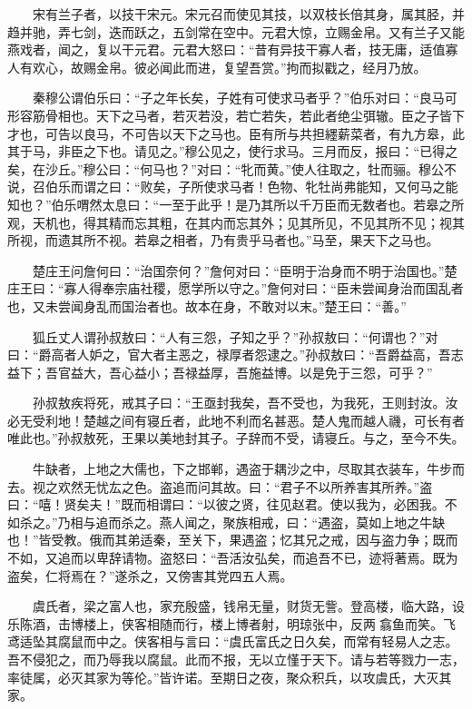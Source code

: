 　　宋有兰子者，以技干宋元。宋元召而使见其技，以双枝长倍其身，属其胫，并趋并驰，弄七剑，迭而跃之，五剑常在空中。元君大惊，立赐金帛。又有兰子又能燕戏者，闻之，复以干元君。元君大怒曰：``昔有异技干寡人者，技无庸，适值寡人有欢心，故赐金帛。彼必闻此而进，复望吾赏。''拘而拟戳之，经月乃放。

　　秦穆公谓伯乐曰：``子之年长矣，子姓有可使求马者乎？''伯乐对曰：``良马可形容筋骨相也。天下之马者，若灭若没，若亡若失，若此者绝尘弭辙。臣之子皆下才也，可告以良马，不可告以天下之马也。臣有所与共担纆薪菜者，有九方皋，此其于马，非臣之下也。请见之。''穆公见之，使行求马。三月而反，报曰：``已得之矣，在沙丘。''穆公曰：``何马也？''对曰：``牝而黄。''使人往取之，牡而骊。穆公不说，召伯乐而谓之曰：``败矣，子所使求马者！色物、牝牡尚弗能知，又何马之能知也？''伯乐喟然太息曰：``一至于此乎！是乃其所以千万臣而无数者也。若皋之所观，天机也，得其精而忘其粗，在其内而忘其外；见其所见，不见其所不见；视其所视，而遗其所不视。若皋之相者，乃有贵乎马者也。''马至，果天下之马也。

　　楚庄王问詹何曰：``治国奈何？''詹何对曰：``臣明于治身而不明于治国也。''楚庄王曰：``寡人得奉宗庙社稷，愿学所以守之。''詹何对曰：``臣未尝闻身治而国乱者也，又未尝闻身乱而国治者也。故本在身，不敢对以末。''楚王曰：``善。''　

　　狐丘丈人谓孙叔敖曰：``人有三怨，子知之乎？''孙叔敖曰：``何谓也？''对曰：``爵高者人妒之，官大者主恶之，禄厚者怨逮之。''孙叔敖曰：``吾爵益高，吾志益下；吾官益大，吾心益小；吾禄益厚，吾施益博。以是免于三怨，可乎？''

　　孙叔敖疾将死，戒其子曰：``王亟封我矣，吾不受也，为我死，王则封汝。汝必无受利地！楚越之间有寝丘者，此地不利而名甚恶。楚人鬼而越人禨，可长有者唯此也。''孙叔敖死，王果以美地封其子。子辞而不受，请寝丘。与之，至今不失。

　　牛缺者，上地之大儒也，下之邯郸，遇盗于耦沙之中，尽取其衣装车，牛步而去。视之欢然无忧厷之色。盗追而问其故。曰：``君子不以所养害其所养。''盗曰：``嘻！贤矣夫！''既而相谓曰：``以彼之贤，往见赵君。使以我为，必困我。不如杀之。''乃相与追而杀之。燕人闻之，聚族相戒，曰：``遇盗，莫如上地之牛缺也！''皆受教。俄而其弟适秦，至关下，果遇盗；忆其兄之戒，因与盗力争；既而不如，又追而以卑辞请物。盗怒曰：``吾活汝弘矣，而追吾不已，迹将著焉。既为盗矣，仁将焉在？''遂杀之，又傍害其党四五人焉。

　　虞氏者，梁之富人也，家充殷盛，钱帛无量，财货无訾。登高楼，临大路，设乐陈酒，击博楼上，侠客相随而行，楼上博者射，明琼张中，反两翕鱼而笑。飞鸢适坠其腐鼠而中之。侠客相与言曰：``虞氏富氏之日久矣，而常有轻易人之志。吾不侵犯之，而乃辱我以腐鼠。此而不报，无以立慬于天下。请与若等戮力一志，率徒属，必灭其家为等伦。''皆许诺。至期日之夜，聚众积兵，以攻虞氏，大灭其家。

